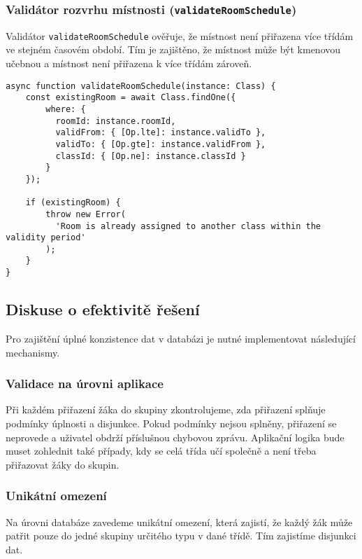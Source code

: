 \subsubsection*{Validátor rozvrhu místnosti (\texttt{validateRoomSchedule})}

Validátor \texttt{validateRoomSchedule} ověřuje, že místnost není přiřazena více třídám ve stejném časovém období. Tím je zajištěno, že místnost může být kmenovou učebnou a místnost není přiřazena k více třídám zároveň.

\newpage
\begin{lstlisting}[title=Kód validátoru rozvrhu místností]
async function validateRoomSchedule(instance: Class) {
    const existingRoom = await Class.findOne({
        where: {
          roomId: instance.roomId,
          validFrom: { [Op.lte]: instance.validTo },
          validTo: { [Op.gte]: instance.validFrom },
          classId: { [Op.ne]: instance.classId }
        }
    });
    
    if (existingRoom) {
        throw new Error(
          'Room is already assigned to another class within the validity period'
        );
    }
}
\end{lstlisting}

\subsection{Diskuse o efektivitě řešení}

Pro zajištění úplné konzistence dat v databázi je nutné implementovat následující mechanismy.

\subsubsection*{Validace na úrovni aplikace}

Při každém přiřazení žáka do skupiny zkontrolujeme, zda přiřazení splňuje podmínky úplnosti a disjunkce. Pokud podmínky nejsou splněny, přiřazení se neprovede a uživatel obdrží příslušnou chybovou zprávu. Aplikační logika bude muset zohlednit také případy, kdy se celá třída učí společně a není třeba přiřazovat žáky do skupin.

\subsubsection*{Unikátní omezení}

Na úrovni databáze zavedeme unikátní omezení, která zajistí, že každý žák může patřit pouze do jedné skupiny určitého typu v dané třídě. Tím zajistíme disjunkci dat.

